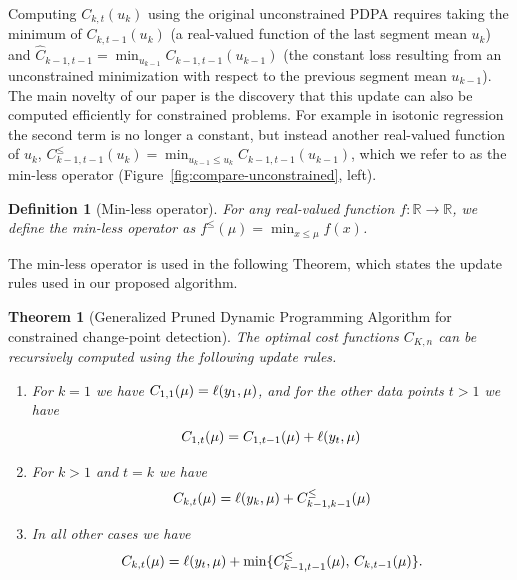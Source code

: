 \documentclass{article}
\newtheorem{theorem}{Theorem}
\newtheorem{definition}{Definition}
\newcommand{\RR}{\mathbb R}
\begin{document}
Computing $C_{k,t}(u_k)$ using the original unconstrained PDPA
requires taking the minimum of $C_{k,t-1}(u_k)$ (a real-valued
function of the last segment mean $u_k$) and
$\hat C_{k-1,t-1} = \min_{u_{k-1}} C_{k-1,t-1}(u_{k-1})$ (the constant loss
resulting from an unconstrained minimization with respect to the
previous segment mean $u_{k-1}$). The main novelty of our paper is the
discovery that this update can also be computed efficiently for
constrained problems. For example in isotonic regression the second
term is no longer a constant, but instead another real-valued function
of $u_k$,
$C_{k-1,t-1}^{\leq}(u_k) = \min_{u_{k-1}\leq u_k}
C_{k-1,t-1}(u_{k-1})$, which we refer to as the min-less operator
(Figure~\ref{fig:compare-unconstrained}, left).

\begin{definition}[Min-less operator]
For any real-valued
function $f:\RR\rightarrow\RR$, we define the min-less operator as
$f^\leq(\mu)=\min_{x\leq \mu} f(x)$.
\end{definition}

The min-less operator is used in the following Theorem, which states
the update rules used in our proposed algorithm.

\begin{theorem}[Generalized Pruned Dynamic Programming Algorithm
  for constrained change-point detection]
  The optimal cost functions $C_{K,n}$ can be recursively computed
  using the following update rules.
\begin{enumerate}
\item For $k=1$ we have
$C_{1,1}(\mu)=\ell(y_1,\mu)$, and for the other data
  points $t>1$ we have
\begin{equation}
C_{1,t}(\mu)=C_{1,t-1}(\mu)+\ell(y_t,\mu)
\end{equation}
\item For $k>1$ and $t=k$ we have
\begin{equation}
  C_{k,t}(\mu)=\ell(y_k, \mu)+C_{k-1,k-1}^\leq(\mu)
\end{equation}
\item In all other cases we have
  \begin{equation}
  C_{k,t}(\mu)=\ell(y_t,\mu)+
  \min\{
  C_{k-1,t-1}^\leq(\mu),\,
  C_{k,t-1}(\mu)
  \}.
  \end{equation}
\end{enumerate}
\end{theorem}
\end{document}
